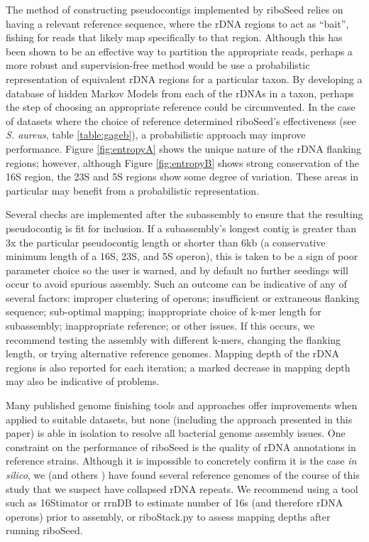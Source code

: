 \documentclass[10pt]{article}
\begin{document}
\begin{linenumbers}
The method of constructing pseudocontigs implemented by riboSeed relies on having a relevant reference sequence, where the rDNA regions to act as ``bait'', fishing for reads that likely map specifically to that region. Although this has been shown to be an effective way to partition the appropriate reads, perhaps a more robust and supervision-free method would be use a probabilistic representation of equivalent rDNA regions for a particular taxon. By developing a database of hidden Markov Models from each of the rDNAs in a taxon, perhaps the step of choosing an appropriate reference could be circumvented. In the case of datasets where the choice of reference determined riboSeed's effectiveness (see \textit{S. aureus}, table \ref{table:gageb}), a probabilistic approach may improve performance. Figure \ref{fig:entropyA} shows the unique nature of the rDNA flanking regions; however, although Figure \ref{fig:entropyB} shows strong conservation of the 16S region, the 23S and 5S regions show some degree of variation. These areas in particular may benefit from a probabilistic representation.


Several checks are implemented after the subassembly to ensure that the resulting pseudocontig is fit for inclusion. If a subassembly's longest contig is greater than 3x the particular pseudocontig length or shorter than 6kb (a conservative minimum length of a 16S, 23S, and 5S operon), this is taken to be a sign of poor parameter choice so the user is warned, and by default no further seedings will occur to avoid spurious assembly. Such an outcome can be indicative of any of several factors: improper clustering of operons; insufficient or extraneous flanking sequence; sub-optimal mapping; inappropriate choice of k-mer length for subassembly; inappropriate reference; or other issues. If this occurs, we recommend testing the assembly with different k-mers, changing the flanking length, or trying alternative reference genomes. Mapping depth of the rDNA regions is also reported for each iteration; a marked decrease in mapping depth may also be indicative of problems.


Many published genome finishing tools and approaches offer improvements when applied to suitable datasets, but none (including the approach presented in this paper) is able in isolation to resolve all bacterial genome assembly issues. One constraint on the performance of riboSeed is the quality of rDNA annotations in reference strains. Although it is impossible to concretely confirm it is the case \textit{in silico}, we (and others \cite{Mariano2016}) have found several reference genomes of the course of this study that we suspect have collapsed rDNA repeats. We recommend using a tool such as 16Stimator\cite{Perisin2016} or rrnDB\cite{Stoddard2014} to estimate number of 16s (and therefore rDNA operons) prior to assembly, or riboStack.py to assess mapping depths after running riboSeed.


\end{linenumbers}
\end{document}

